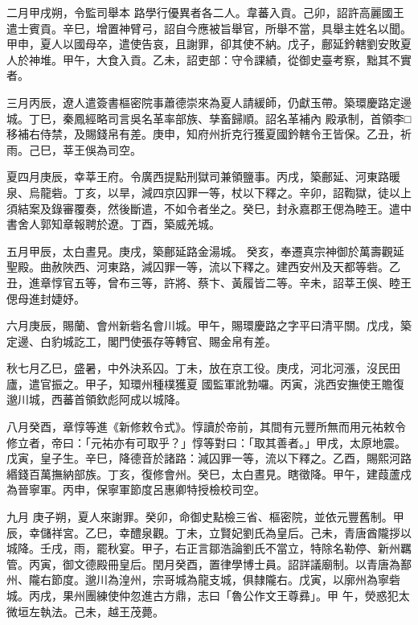 \begin{pinyinscope}
 二月甲戌朔，令監司舉本
 路學行優異者各二人。韋蕃入貢。己卯，詔許高麗國王遣士賓貢。辛巳，增置神臂弓，詔自今應被旨舉官，所舉不當，具舉主姓名以聞。甲申，夏人以國母卒，遣使告哀，且謝罪，卻其使不納。戊子，鄜延鈐轄劉安敗夏人於神堆。甲午，大食入貢。乙未，詔吏部：守令課績，從御史臺考察，黜其不實者。



 三月丙辰，遼人遣簽書樞密院事蕭德崇來為夏人請緩師，仍獻玉帶。築環慶路定邊城。丁巳，秦鳳經略司言吳名革率部族、孳畜歸順。詔名革補內
 殿承制，首領李□移補右侍禁，及賜錢帛有差。庚申，知府州折克行獲夏國鈐轄令王皆保。乙丑，祈雨。己巳，莘王俁為司空。



 夏四月庚辰，幸莘王府。令廣西提點刑獄司兼領鹽事。丙戌，築鄜延、河東路暖泉、烏龍砦。丁亥，以旱，減四京囚罪一等，杖以下釋之。辛卯，詔鞫獄，徒以上須結案及錄審覆奏，然後斷遣，不如令者坐之。癸巳，封永嘉郡王偲為睦王。遣中書舍人郭知章報聘於遼。丁酉，築威羌城。



 五月甲辰，太白晝見。庚戌，築鄜延路金湯城。
 癸亥，奉遷真宗神御於萬壽觀延聖殿。曲赦陜西、河東路，減囚罪一等，流以下釋之。建西安州及天都等砦。乙丑，進章惇官五等，曾布三等，許將、蔡卞、黃履皆二等。辛未，詔莘王俁、睦王偲母進封婕妤。



 六月庚辰，賜蘭、會州新砦名會川城。甲午，賜環慶路之字平曰清平關。戊戌，築定邊、白豹城訖工，閣門使張存等轉官、賜金帛有差。



 秋七月乙巳，盛暑，中外決系囚。丁未，放在京工役。庚戌，河北河漲，沒民田廬，遣官振之。甲子，知環州種樸獲夏
 國監軍訛勃囉。丙寅，洮西安撫使王贍復邈川城，西蕃首領欽彪阿成以城降。



 八月癸酉，章惇等進《新修敕令式》。惇讀於帝前，其間有元豐所無而用元祐敕令修立者，帝曰：「元祐亦有可取乎？」惇等對曰：「取其善者。」甲戌，太原地震。戊寅，皇子生。辛巳，降德音於諸路：減囚罪一等，流以下釋之。乙酉，賜熙河路緡錢百萬撫納部族。丁亥，復修會州。癸巳，太白晝見。瞎徵降。甲午，建葭蘆戍為晉寧軍。丙申，保寧軍節度呂惠卿特授檢校司空。



 九月
 庚子朔，夏人來謝罪。癸卯，命御史點檢三省、樞密院，並依元豐舊制。甲辰，幸儲祥宮。乙巳，幸醴泉觀。丁未，立賢妃劉氏為皇后。己未，青唐酋隴拶以城降。壬戌，雨，罷秋宴。甲子，右正言鄒浩論劉氏不當立，特除名勒停、新州羈管。丙寅，御文德殿冊皇后。閏月癸酉，置律學博士員。詔詳議廟制。以青唐為鄯州、隴右節度。邈川為湟州，宗哥城為龍支城，俱隸隴右。戊寅，以廓州為寧砦城。丙戌，果州團練使仲忽進古方鼎，志曰「魯公作文王尊彞」。甲
 午，熒惑犯太微垣左執法。己未，越王茂薨。




\end{pinyinscope}
